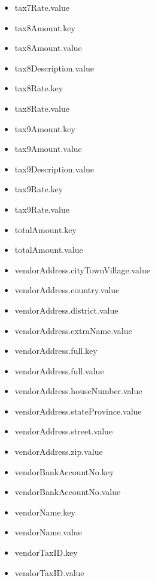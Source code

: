 \begin{multicols}{2}
\begin{itemize}
\item[] tax7Rate.value
\item[] tax8Amount.key
\item[] tax8Amount.value
\item[] tax8Description.value
\item[] tax8Rate.key
\item[] tax8Rate.value
\item[] tax9Amount.key
\item[] tax9Amount.value
\item[] tax9Description.value
\item[] tax9Rate.key
\item[] tax9Rate.value
\item[] totalAmount.key
\item[] totalAmount.value
\item[] vendorAddress.cityTownVillage.value
\item[] vendorAddress.country.value
\item[] vendorAddress.district.value
\item[] vendorAddress.extraName.value
\item[] vendorAddress.full.key
\item[] vendorAddress.full.value
\item[] vendorAddress.houseNumber.value
\item[] vendorAddress.stateProvince.value
\item[] vendorAddress.street.value
\item[] vendorAddress.zip.value
\item[] vendorBankAccountNo.key
\item[] vendorBankAccountNo.value
\item[] vendorName.key
\item[] vendorName.value
\item[] vendorTaxID.key
\item[] vendorTaxID.value
\end{itemize}
\end{multicols}
\cleardoublepage



